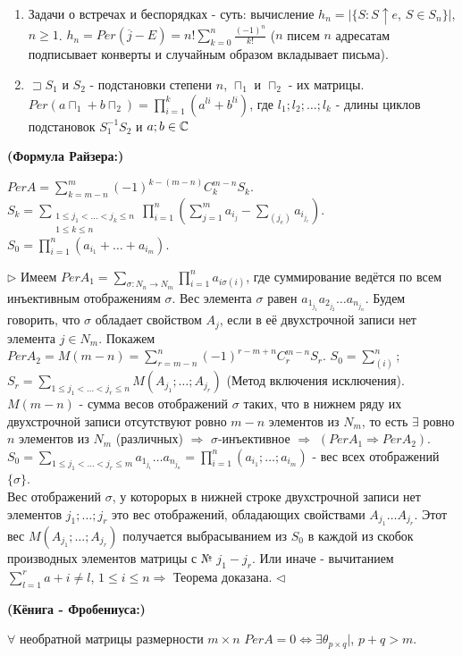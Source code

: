 \begin{enumerate}
    \item Задачи о встречах и беспорядках - суть: вычисление 
    $h_n=|\{S:S\uparrow e$, $S\in S_n \}|$, $n \geq 1$. $h_n=Per(\overline j - E)=n! \sum\limits_{k=0}^n \frac{(-1)^n}{k!}$ ($n$ писем $n$ адресатам подписывает конверты и случайным образом вкладывает письма).
    \item $\sqsupset S_1$ и $S_2$ - подстановки степени $n$, $\sqcap_1$ и $\sqcap_2$ - их матрицы. \\$Per(a\sqcap_1+b\sqcap_2) = \prod\limits_{i=1}^k (a^{li}+b^{li})$, где $l_1;l_2;\ldots;l_k$ - длины циклов подстановок $S^{-1}_1 S_2$ и $a;b \in \mathbb{C}$
\end{enumerate}

\thr \textbf{(Формула Райзера:)}

$PerA=\sum\limits_{k=m-n}^m(-1)^{k-(m-n)}C^{m-n}_k S_k$.\\$S_k=\sum\limits_{\substack{1 \leq j_1 < \ldots < j_k \leq n\\1 \leq k \leq n}} \prod\limits_{i=1}^n(\sum\limits_{j=1}^m a_{i_j} -\sum\limits_{(j_e)} a_{i_{j_e}})$. 
$S_0=\prod\limits_{i=1}^n(a_{i_1}+\ldots+a_{i_m})$.

\proof
$\rhd$ Имеем $PerA_1=\sum\limits_{\sigma:N_n \rightarrow N_m}\prod\limits_{i=1}^n a_{i\sigma(i)}$, где суммирование ведётся по всем инъективным отображениям $\sigma$. Вес элемента $\sigma$ равен $a_{1_{j_1}}a_{2_{j_2}}\ldots a_{n_{j_n}}$. Будем говорить, что $\sigma$ обладает свойством $A_j$, если в её двухстрочной записи нет элемента $j\in N_m$. 
Покажем $PerA_2=M(m-n)=\sum\limits_{r=m-n}^n (-1)^{r-m+n}C^{m-n}_r S_r$. $S_0=\sum\limits_{(i)}^n$; $S_r=\sum\limits_{1\leq j_1<\ldots<j_r\leq n}M(A_{j_1};\ldots;A_{j_r})$ (Метод включения исключения).
$M(m-n)$ - сумма весов отображений $\sigma$ таких, что в нижнем ряду их двухстрочной записи отсутствуют ровно $m-n$ элементов из $N_m$, то есть $\exists$ ровно $n$ элементов из $N_m$ (различных) $\Rightarrow$ $\sigma$-инъективное $\Rightarrow$ $(PerA_1 \Rightarrow PerA_2)$.
$S_0=\sum\limits_{1\leq j_1<\ldots<j_r\leq m}a_{1_{j_1}}\ldots a_{n_{j_n}}=\prod\limits_{i=1}^n(a_{i_1};\ldots;a_{i_m})$ - вес всех отображений $\{\sigma\}$.
\\Вес отображений $\sigma$, у которорых в нижней строке двухстрочной записи нет элементов $j_1;\ldots;j_r$ это вес отображений, обладающих свойствами $A_{j_1}\ldots A_{j_r}$. Этот вес $M(A_{j_1};\ldots;A_{j_r})$ получается выбрасыванием из $S_0$ в каждой из скобок производных элементов матрицы с № $j_1-j_r$. Или иначе - вычитанием $\sum\limits_{l=1}^r a+i\neq l$, $1\leq i\leq n \Rightarrow$ Теорема доказана. $\triangleleft$


\thr \textbf{(Кёнига - Фробениуса:)}

$\forall$ необратной матрицы размерности $m\times n$ 
$PerA=0 \Leftrightarrow \exists  \theta_{p\times q}|$, $p+q>m$.

